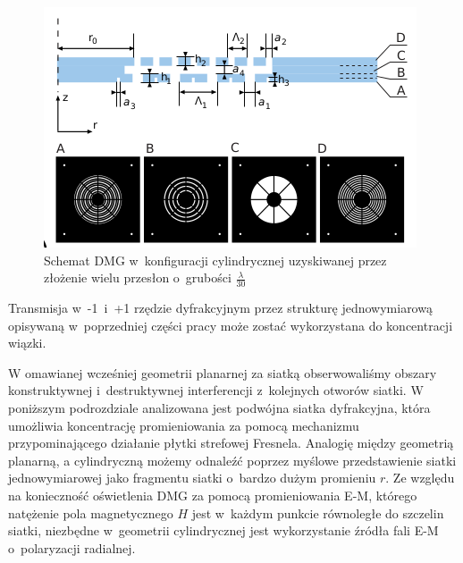 \begin{figure}
	\includegraphics[width=\textwidth]{images/dmg/express_siatki.png}
	\caption{Schemat DMG w~konfiguracji cylindrycznej uzyskiwanej przez złożenie wielu przesłon o~grubości $\frac{\lambda}{30}$ \cite{Yavorskiy:14}}
	\label{fig:schem-cyl}
\end{figure}

Transmisja w~-1~i~+1 rzędzie dyfrakcyjnym przez strukturę jednowymiarową opisywaną w~poprzedniej części pracy może zostać wykorzystana do koncentracji wiązki. 

W omawianej wcześniej geometrii planarnej za siatką obserwowaliśmy obszary konstruktywnej i~destruktywnej interferencji z~kolejnych otworów siatki. W poniższym podrozdziale analizowana jest podwójna siatka dyfrakcyjna, która umożliwia koncentrację promieniowania za pomocą mechanizmu przypominającego działanie płytki strefowej Fresnela. Analogię między geometrią planarną, a cylindryczną możemy odnaleźć poprzez myślowe przedstawienie siatki jednowymiarowej jako fragmentu siatki o~bardzo dużym promieniu $r$. Ze względu na konieczność oświetlenia DMG za pomocą promieniowania E-M, którego natężenie pola magnetycznego $H$ jest w~każdym punkcie równoległe do szczelin siatki, niezbędne w~geometrii cylindrycznej jest wykorzystanie źródła fali E-M o~polaryzacji radialnej. 


